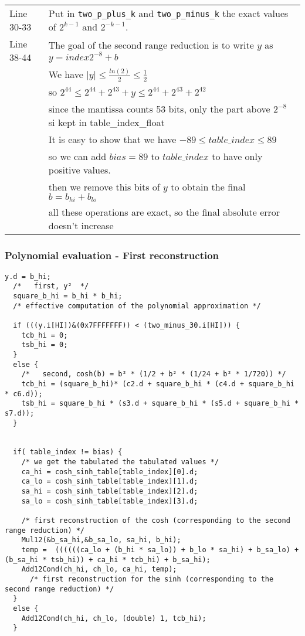 \begin{tabular}{ll}
Line 30-33 & Put in \texttt{two\_p\_plus\_k} and \texttt{two\_p\_minus\_k} the exact values of $2^{k-1}$ and $2^{-k-1}$.\\
Line 38-44 & The goal of the second range reduction is to write $y$ as $y = index  2^{-8} + b$ \\
           & We have $|y| \leq \frac{ln(2)}{2} \leq \frac{1}{2}$ \\
           & so $2^{44} \leq 2^{44} + 2^{43} + y \leq 2^{44} + 2^{43} + 2^{42}$ \\
           & since the mantissa counts 53 bits, only the part above $2^{-8}$ si kept in table\_index\_float\\
           & It is easy to show that we have $-89 \leq table\_index \leq 89$ \\
           & so we can add $bias = 89$ to $table\_index$ to have only positive values. \\
           & then we remove this bits of $y$ to obtain the final $b = b_{hi} + b_{lo}$ \\
           & all these operations are exact, so the final absolute error doesn't increase \\

\end{tabular}


\subsubsection{Polynomial evaluation - First reconstruction}

\begin{lstlisting}[caption={Procedure \texttt{cosh\_quick} - polynomial evaluation - first reconstruction},firstnumber=45]
  y.d = b_hi;
  /*   first, y²  */
  square_b_hi = b_hi * b_hi;
  /* effective computation of the polynomial approximation */
  
  if (((y.i[HI])&(0x7FFFFFFF)) < (two_minus_30.i[HI])) {
    tcb_hi = 0;
    tsb_hi = 0;
  }
  else {
    /*   second, cosh(b) = b² * (1/2 + b² * (1/24 + b² * 1/720)) */
    tcb_hi = (square_b_hi)* (c2.d + square_b_hi * (c4.d + square_b_hi * c6.d));
    tsb_hi = square_b_hi * (s3.d + square_b_hi * (s5.d + square_b_hi * s7.d));
  }
 

  if( table_index != bias) {
    /* we get the tabulated the tabulated values */
    ca_hi = cosh_sinh_table[table_index][0].d;
    ca_lo = cosh_sinh_table[table_index][1].d;
    sa_hi = cosh_sinh_table[table_index][2].d;
    sa_lo = cosh_sinh_table[table_index][3].d;
    
    /* first reconstruction of the cosh (corresponding to the second range reduction) */
    Mul12(&b_sa_hi,&b_sa_lo, sa_hi, b_hi);
    temp =  ((((((ca_lo + (b_hi * sa_lo)) + b_lo * sa_hi) + b_sa_lo) + (b_sa_hi * tsb_hi)) + ca_hi * tcb_hi) + b_sa_hi);
    Add12Cond(ch_hi, ch_lo, ca_hi, temp);
      /* first reconstruction for the sinh (corresponding to the second range reduction) */
  }
  else {
    Add12Cond(ch_hi, ch_lo, (double) 1, tcb_hi);
  }
  
  
\end{lstlisting}

